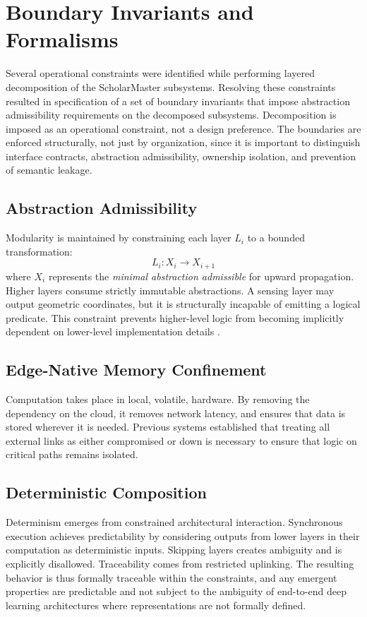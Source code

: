 \documentclass[conference]{IEEEtran}
\begin{document}
\section{Boundary Invariants and Formalisms}
Several operational constraints were identified while performing layered decomposition of the ScholarMaster subsystems. Resolving these constraints resulted in specification of a set of boundary invariants that impose abstraction admissibility requirements on the decomposed subsystems. Decomposition is imposed as an operational constraint, not a design preference. The boundaries are enforced structurally, not just by organization, since it is important to distinguish interface contracts, abstraction admissibility, ownership isolation, and prevention of semantic leakage.

\subsection{Abstraction Admissibility}
Modularity is maintained by constraining each layer $L_i$ to a bounded transformation:
\begin{equation}
L_i : X_i \to X_{i+1}
\end{equation}
where $X_i$ represents the \textit{minimal abstraction admissible} for upward propagation. Higher layers consume strictly immutable abstractions. A sensing layer may output geometric coordinates, but it is structurally incapable of emitting a logical predicate. This constraint prevents higher-level logic from becoming implicitly dependent on lower-level implementation details \cite{b12, b20}.

\subsection{Edge-Native Memory Confinement}
Computation takes place in local, volatile, hardware. By removing the dependency on the cloud, it removes network latency, and ensures that data is stored wherever it is needed. Previous systems established that treating all external links as either compromised or down is necessary to ensure that logic on critical paths remains isolated.

\subsection{Deterministic Composition}
Determinism emerges from constrained architectural interaction. Synchronous execution achieves predictability by considering outputs from lower layers in their computation as deterministic inputs. Skipping layers creates ambiguity and is explicitly disallowed. Traceability comes from restricted uplinking. The resulting behavior is thus formally traceable within the constraints, and any emergent properties are predictable and not subject to the ambiguity of end-to-end deep learning architectures where representations are not formally defined.
\end{document}
